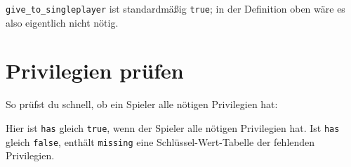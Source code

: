 \begin{Shaded}
\begin{Highlighting}[]
\OperatorTok{(}\OperatorTok{,} \OperatorTok{\{}
     \OperatorTok{=} \OperatorTok{,}
     \OperatorTok{=} \OperatorTok{,}
\OperatorTok{\})}
\end{Highlighting}
\end{Shaded}

\texttt{give\_\allowbreak{}to\_\allowbreak{}singleplayer} ist
standardmäßig \texttt{true}; in der Definition oben wäre es also
eigentlich nicht nötig.

\section{Privilegien prüfen}\label{privilegien-pruxfcfen}

So prüfst du schnell, ob ein Spieler alle nötigen Privilegien hat:

\begin{Shaded}
\begin{Highlighting}[]
 \OperatorTok{,}  \OperatorTok{=}
    \OperatorTok{(}\OperatorTok{,} \OperatorTok{\{}
         \OperatorTok{=} \OperatorTok{,}
         \OperatorTok{=} \OperatorTok{,}
    \OperatorTok{\})}
\end{Highlighting}
\end{Shaded}

Hier ist \texttt{has} gleich \texttt{true}, wenn der Spieler alle
nötigen Privilegien hat. Ist \texttt{has} gleich \texttt{false}, enthält
\texttt{missing} eine Schlüssel-Wert-Tabelle der fehlenden Privilegien.

\begin{Shaded}
\begin{Highlighting}[]
 \OperatorTok{,}  \OperatorTok{=} \OperatorTok{(}\OperatorTok{,} \OperatorTok{\{}
     \OperatorTok{=} \OperatorTok{,}
     \OperatorTok{=} \OperatorTok{,}
\OperatorTok{\})}

  
    \OperatorTok{(}\OperatorTok{)}
    \OperatorTok{(}  \OperatorTok{(}\OperatorTok{))}
\end{Highlighting}
\end{Shaded}

